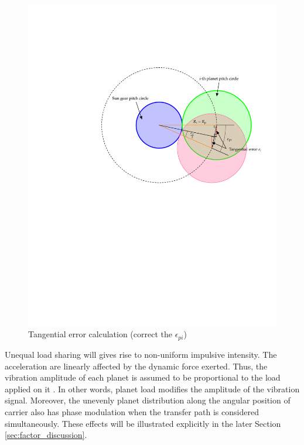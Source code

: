 \documentclass[a4paper,fleqn]{cas-sc}%
\begin{document}
\begin{figure}[pos=htbp]
    \centering
    \includegraphics[scale=0.5]{tangential_error.pdf}
    \caption{Tangential error calculation (correct the $\epsilon_{pi}$)}
    \label{fig:tangential_error}
\end{figure}
\par Unequal load sharing will gives rise to non-uniform impulsive intensity. The acceleration are linearly affected by the dynamic force exerted. Thus, the vibration amplitude of each planet is assumed to be proportional to the load applied on it \cite{Inalpolat2009}. In other words, planet load modifies the amplitude of the vibration signal. Moreover, the unevenly planet distribution along the angular position of carrier also has phase modulation when the transfer path is considered simultaneously. These effects will be illustrated explicitly in the later Section \ref{sec:factor_discussion}. 
\end{document}
